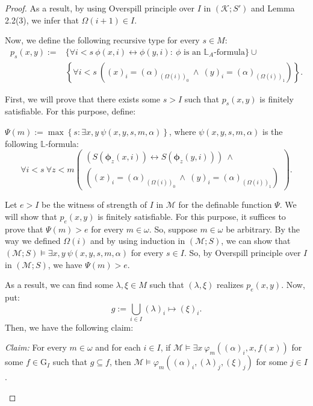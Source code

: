\documentclass[11pt]{article}
\theoremstyle{plain}
\theoremstyle{definition}
\newcommand{\M}{\mathcal{M}}
\newcommand{\K}{\mathcal{K}}
\newcommand{\G}{\mathrm{G}}
\begin{document}
\begin{proof}
As a result, by using  Overspill principle over $ I$ in $(\K;S')$ and Lemma 2.2(3), we infer that $\Omega(i+1)\in I$.	
	
	
		Now, we define the following recursive type for every $s\in M$:
	\begin{align*}
		p_{s}(x,y):=&\{\forall i<s \ \phi(x,i)\leftrightarrow\phi(y,i): \ \phi \text{ is an } \mathbb{L}_{A}\text{-formula}\}\cup\\&
	\left\lbrace	
		\forall i<s \ 
	 ((x)_{i}=(\alpha)_{(\Omega(i))_{0}} \ \wedge\ (y)_{i}=(\alpha)_{(\Omega(i))_{1}}) 
	\right\rbrace.
\end{align*}	
	
	
	First, we will prove that there exists some  $s>I$ such that  $p_{s}(x,y)$ is finitely satisfiable. For this purpose, define:
	\begin{center}
		$\Psi(m):= \max\left\lbrace s: \exists x,y \ 	\psi(x,y,s,m,\alpha) \right\rbrace$, where $\psi(x,y,s,m,\alpha) $ is the following $\mathbb{L}$-formula:
		$$\forall i<s \ \forall z<m \left(\begin{array}{c}
			(S(\bm{\phi}_{z}(x,i))\leftrightarrow S(\bm{\phi}_{z}(y,i))) \ \wedge\\
				 ((x)_{i}=(\alpha)_{(\Omega(i))_{0}} \ \wedge\ (y)_{i}=(\alpha)_{(\Omega(i))_{1}}) 
		\end{array}\right)  .$$
	\end{center}
	
	Let $e>I$ be the witness of strength of $I$ in $\M$ for the definable function $\Psi$. We will  show that $p_{e}(x,y)$ is finitely satisfiable. For this purpose, it suffices to prove that $\Psi(m)>e$ for every $m\in\omega$. So, suppose $m\in\omega$ be arbitrary. By the way we defined $\Omega(i)$ and by using induction in $(\M;S)$, we can show  that ${(\M;S)\models\exists x,y \ \psi(x,y,s,m,\alpha)}$ for every $s\in I$. So, by Overspill principle over $I$ in $(\M;S)$, we have $\Psi(m)>e$.
	
	As a result,  we can find some $ \lambda,\xi\in M $ such that $(\lambda,\xi)$ realizes $p_{e}(x,y)$. Now, put:
	$$ g:=\bigcup_{i\in I}(\lambda)_{i}\mapsto(\xi)_{i} .$$ 
	Then, we have the following claim:
	\begin{center}
		\textit{Claim:} For every $m\in\omega$ and for each $i\in I$, if  $\M\models\exists x \ \varphi_{m}((\alpha)_{i},x,f(x))$ for some $f\in\G_{I}$ such that $g\subseteq f$, then $\M\models\varphi_{m}((\alpha)_{i},(\lambda)_{j},(\xi)_{j})$ for some $j\in I$.
	\end{center}
	

\end{proof}
\end{document}
